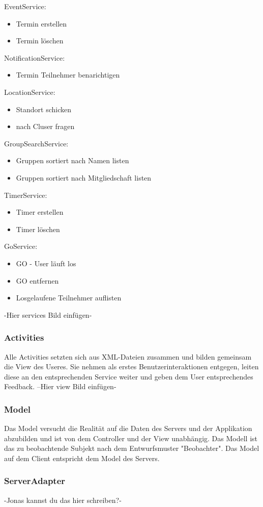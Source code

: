 EventService:
\begin{itemize}
\item Termin erstellen
\item Termin löschen
\end{itemize}
NotificationService:
\begin{itemize}
\item Termin Teilnehmer benarichtigen
\end{itemize}
LocationService:
\begin{itemize}
\item Standort schicken
\item nach Cluser fragen
\end{itemize}
GroupSearchService:
\begin{itemize}
\item Gruppen sortiert nach Namen listen
\item Gruppen sortiert nach Mitgliedschaft listen
\end{itemize}
TimerService:
\begin{itemize}
\item Timer erstellen
\item Timer löschen
\end{itemize}
GoService:
\begin{itemize}
\item GO - User läuft los
\item GO entfernen
\item Losgelaufene Teilnehmer auflisten
\end{itemize}
-Hier services Bild einfügen-

	\subsubsection{Activities}
	Alle Activities setzten sich aus XML-Dateien zusammen und bilden gemeinsam die View des Useres.
Sie nehmen als erstes Benutzerinteraktionen entgegen, leiten diese an den entsprechenden Service weiter und geben dem User entsprechendes Feedback.
	--Hier view Bild einfügen-
	\subsubsection{Model}
Das Model versucht die Realität auf die Daten des Servers und der Applikation abzubilden und ist von dem Controller und der View unabhängig. Das Modell ist das zu beobachtende Subjekt nach dem Entwurfsmuster "Beobachter".
Das Model auf dem Client entspricht dem Model des Servers.
	\subsubsection{ServerAdapter}
-Jonas kannst du das hier schreiben?-
	\newpage
